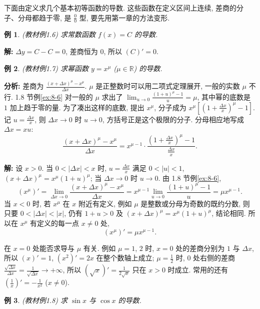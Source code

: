 \documentclass[UTF8,openany]{ctexbook}
\theoremstyle{chinesetextbook}
\newtheorem{example}{例}[section]
\newenvironment{cnsolution}{\par\indent\textbf{解:} \ignorespaces}{\par}
\begin{document}
下面由定义求几个基本初等函数的导数. 这些函数在定义区间上连续, 差商的分子、分母都趋于零, 是 $\displaystyle\frac00$ 型, 要先用第一章的方法变形.
\begin{example}\label{ex:c2-1-6}
\textnormal{(教材例1.6)} 求常数函数 $f(x)=C$ 的导数.
\end{example}
\begin{cnsolution}
$\Delta y=C-C=0$, 差商恒为 $0$, 所以 $(C)'=0$.
\end{cnsolution}
\begin{example}\label{ex:c2-1-7}
\textnormal{(教材例1.7)} 求幂函数 $y=x^\mu$ ($\mu\in\mathbb R$) 的导数.
\end{example}
\par\indent\textbf{分析:} 差商为 $\displaystyle\frac{(x+\Delta x)^\mu-x^\mu}{\Delta x}$. $\mu$ 是正整数时可以用二项式定理展开, 一般的实数 $\mu$ 不行. 1.8 节例\ref{ex:8-6} 对一般的 $\mu$ 求出了 $\displaystyle\lim_{u\to0}\frac{(1+u)^\mu-1}u=\mu$, 其中幂的底数是 $1$ 加上趋于零的量. 为了凑出这样的底数, 提出 $x^\mu$, 分子成为 $\displaystyle x^\mu\left[\left(1+\frac{\Delta x}x\right)^\mu-1\right]$. 记 $\displaystyle u=\frac{\Delta x}x$, 则 $\Delta x\to0$ 时 $u\to0$, 方括号正是这个极限的分子. 分母相应地写成 $\Delta x=xu$:
\[
\frac{(x+\Delta x)^\mu-x^\mu}{\Delta x}=x^{\mu-1}\cdot\frac{\left(1+\frac{\Delta x}x\right)^\mu-1}{\frac{\Delta x}x}.
\]
\begin{cnsolution}
设 $x>0$. 当 $0<|\Delta x|<x$ 时, $\displaystyle u=\frac{\Delta x}x$ 满足 $0<|u|<1$, $(x+\Delta x)^\mu=x^\mu(1+u)^\mu$; 当 $\Delta x\to0$ 时 $u\to0$. 由 1.8 节例\ref{ex:8-6},
\[
(x^\mu)'=\lim_{\Delta x\to0}\frac{(x+\Delta x)^\mu-x^\mu}{\Delta x}=x^{\mu-1}\lim_{u\to0}\frac{(1+u)^\mu-1}u=\mu x^{\mu-1}.
\]
当 $x<0$ 时, 若 $x^\mu$ 在 $x$ 附近有定义, 例如 $\mu$ 是整数或分母为奇数的既约分数, 则只要 $0<|\Delta x|<|x|$, 仍有 $1+u>0$ 及 $(x+\Delta x)^\mu=x^\mu(1+u)^\mu$, 结论相同. 所以在 $x^\mu$ 有定义的每一点 $x\ne0$ 处,
\[
(x^\mu)'=\mu x^{\mu-1}.
\]
\end{cnsolution}
在 $x=0$ 处能否求导与 $\mu$ 有关. 例如 $\mu=1$, $2$ 时, $x=0$ 处的差商分别为 $1$ 与 $\Delta x$, 所以 $(x)'=1$, $(x^2)'=2x$ 在整个数轴上成立; $\displaystyle\mu=\frac12$ 时, $0$ 处右侧的差商 $\displaystyle\frac{\sqrt{\Delta x}}{\Delta x}=\frac1{\sqrt{\Delta x}}\to+\infty$, 所以 $\displaystyle\left(\sqrt x\right)'=\frac1{2\sqrt x}$ 只在 $x>0$ 时成立. 常用的还有 $\displaystyle\left(\frac1x\right)'=-\frac1{x^2}$ ($x\ne0$).
\begin{example}\label{ex:c2-1-8}
\textnormal{(教材例1.8)} 求 $\sin x$ 与 $\cos x$ 的导数.
\end{example}
\end{document}

